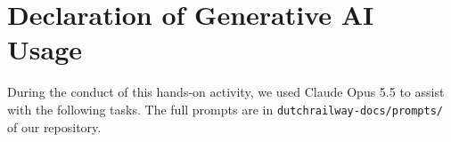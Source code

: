 \documentclass[sigconf, pbalance]{acmart}
\renewcommand{\_}{\oldunderscore\allowbreak}}
\begin{document}












\section*{Declaration of Generative AI Usage}

% 
During the conduct of this hands-on activity, we used Claude Opus 5.5 to assist with the following tasks. The full prompts are in \texttt{dutch\_railway-docs/prompts/} of our repository.
\end{document}
